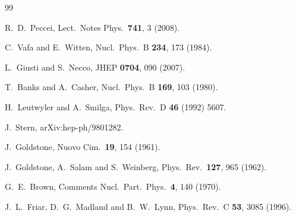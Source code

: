 \documentclass[aps,rmp,nofootinbib,twocolumn,floatfix]{revtex4}
\begin{document}
\begin{thebibliography}{99}


  R.~D.~Peccei,
  Lect.\ Notes Phys.\  {\bf 741}, 3 (2008).

  C.~Vafa and E.~Witten,
  Nucl.\ Phys.\ B {\bf 234}, 173 (1984).

  L.~Giusti and S.~Necco,
  JHEP {\bf 0704}, 090 (2007).


  T.~Banks and A.~Casher,
  Nucl.\ Phys.\ B {\bf 169}, 103 (1980).

  H.~Leutwyler and A.~Smilga,
  Phys.\ Rev.\ D {\bf 46} (1992) 5607.

  J.~Stern,
  arXiv:hep-ph/9801282.

  J.~Goldstone,
  Nuovo Cim.\  {\bf 19}, 154 (1961).

  J.~Goldstone, A.~Salam and S.~Weinberg,
  Phys.\ Rev.\  {\bf 127}, 965 (1962).

  G.~E.~Brown,
  Comments Nucl.\ Part.\ Phys.\  {\bf 4}, 140 (1970).


  J.~L.~Friar, D.~G.~Madland and B.~W.~Lynn,
  Phys.\ Rev.\  C {\bf 53}, 3085 (1996).


\end{thebibliography}
\end{document}
